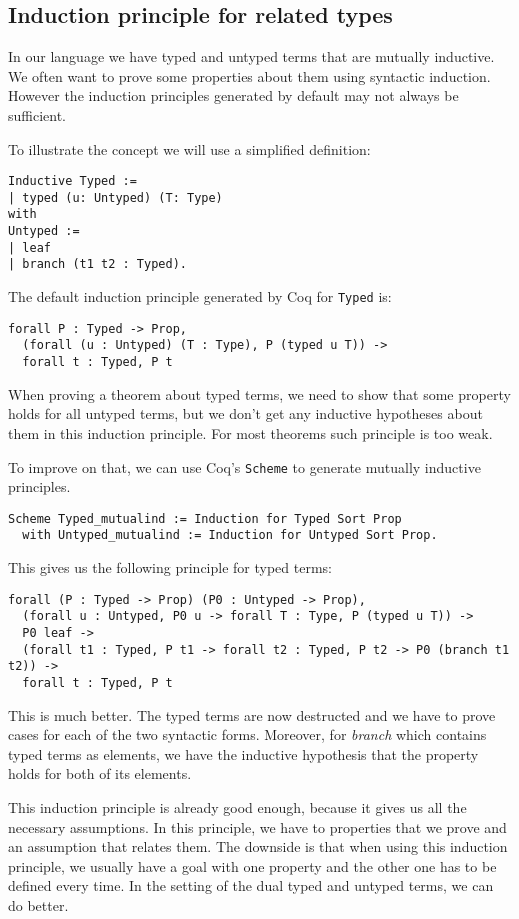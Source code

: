 \documentclass[runningheads]{article}
\begin{document}
\subsection{Induction principle for related types}
In our language we have typed and untyped terms that are mutually inductive. We often want to prove some properties about them using syntactic induction. However the induction principles generated by default may not always be sufficient.

To illustrate the concept we will use a simplified definition:
\begin{lstlisting}
Inductive Typed :=
| typed (u: Untyped) (T: Type)
with
Untyped :=
| leaf
| branch (t1 t2 : Typed).
\end{lstlisting}

The default induction principle generated by Coq for \texttt{Typed} is:
\begin{lstlisting}
forall P : Typed -> Prop,
  (forall (u : Untyped) (T : Type), P (typed u T)) -> 
  forall t : Typed, P t
\end{lstlisting}

When proving a theorem about typed terms, we need to show that some property holds for all untyped terms, but we don't get any inductive hypotheses about them in this induction principle. For most theorems such principle is too weak.

To improve on that, we can use Coq's \texttt{Scheme} to generate mutually inductive principles.

\begin{lstlisting}
Scheme Typed_mutualind := Induction for Typed Sort Prop
  with Untyped_mutualind := Induction for Untyped Sort Prop.
\end{lstlisting}

This gives us the following principle for typed terms:
\begin{lstlisting}
forall (P : Typed -> Prop) (P0 : Untyped -> Prop),
  (forall u : Untyped, P0 u -> forall T : Type, P (typed u T)) ->
  P0 leaf ->
  (forall t1 : Typed, P t1 -> forall t2 : Typed, P t2 -> P0 (branch t1 t2)) ->
  forall t : Typed, P t
\end{lstlisting}

This is much better. The typed terms are now destructed and we have to prove cases for each of the two syntactic forms. Moreover, for \textit{branch} which contains typed terms as elements, we have the inductive hypothesis that the property holds for both of its elements.

This induction principle is already good enough, because it gives us all the necessary assumptions. In this principle, we have to properties that we prove and an assumption that relates them. The downside is that when using this induction principle, we usually have a goal with one property and the other one has to be defined every time. In the setting of the dual typed and untyped terms, we can do better.
\end{document}
